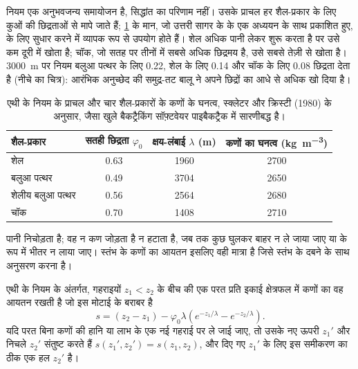 नियम एक अनुभवजन्य समायोजन है, सिद्धांत का परिणाम नहीं। उसके प्राचल हर शैल-प्रकार के लिए कुओं की छिद्रताओं से मापे जाते हैं; \cref{tab:b1:diagenesis-basins:athy} के मान, जो उत्तरी सागर के  के एक अध्ययन के साथ प्रकाशित हुए,  के लिए सुधार करने में व्यापक रूप से उपयोग होते हैं। शेल अधिक पानी लेकर शुरू करता है पर उसे कम दूरी में खोता है; चॉक, जो सतह पर तीनों में सबसे अधिक छिद्रमय है, उसे सबसे तेज़ी से खोता है। \qty{3000}{m} पर नियम बलुआ पत्थर के लिए \num{0.22}, शेल के लिए \num{0.14} और चॉक के लिए \num{0.08} छिद्रता देता है (नीचे का चित्र): आरंभिक अनुच्छेद की समुद्र-तट बालू ने अपने छिद्रों का आधे से अधिक खो दिया है।

\begin{table}[htbp]
\centering
\begin{tabular}{lccc}
\hline
शैल-प्रकार & सतही छिद्रता $\varphi_0$ & क्षय-लंबाई $\lambda$ (m) & कणों का घनत्व (\unit{kg.m^{-3}}) \\
\hline
शेल            & 0.63 & 1960 & 2700 \\
बलुआ पत्थर        & 0.49 & 3704 & 2650 \\
शेलीय बलुआ पत्थर  & 0.56 & 2564 & 2680 \\
चॉक            & 0.70 & 1408 & 2710 \\
\hline
\end{tabular}
\caption{एथी के नियम के प्राचल और चार शैल-प्रकारों के कणों के घनत्व, स्क्लेटर और क्रिस्टी (1980) के अनुसार, जैसा खुले बैकट्रैकिंग सॉफ़्टवेयर पाइबैकट्रैक में सारणीबद्ध है।}
\label{tab:b1:diagenesis-basins:athy}
\end{table}

 पानी निचोड़ता है; वह न कण जोड़ता है न हटाता है, जब तक कुछ घुलकर बाहर न ले जाया जाए या  के रूप में भीतर न लाया जाए। स्तंभ के कणों का आयतन इसलिए वही मात्रा है जिसे स्तंभ के दबने के साथ अनुसरण करना है।

\begin{proposition}[परत की ठोस मोटाई]\label{prop:b1:diagenesis-basins:solid}
एथी के नियम के अंतर्गत, गहराइयों $z_1 < z_2$ के बीच की एक परत प्रति इकाई क्षेत्रफल में कणों का वह आयतन रखती है जो इस मोटाई के बराबर है
\[
  s = (z_2 - z_1) - \varphi_0 \lambda \left( e^{-z_1/\lambda} - e^{-z_2/\lambda} \right).
\]
यदि परत बिना कणों की हानि या लाभ के एक नई गहराई पर ले जाई जाए, तो उसके नए ऊपरी $z_1'$ और निचले $z_2'$ संतुष्ट करते हैं $s(z_1', z_2') = s(z_1, z_2)$, और दिए गए
$z_1'$ के लिए इस समीकरण का ठीक एक हल $z_2'$ है।
\end{proposition}

